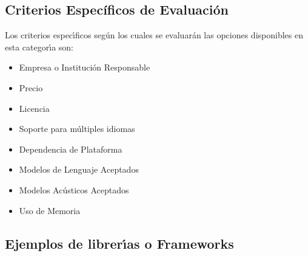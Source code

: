 \subsection{Criterios Espec\'ificos de Evaluaci\'on}

Los criterios espec{\'\i}ficos seg\'un los cuales se evaluar\'an las opciones disponibles en esta
categor{\'\i}a son:

\begin{itemize}
	\item Empresa o Instituci\'on Responsable
	\item Precio
	\item Licencia
	\item Soporte para m\'ultiples idiomas
	\item Dependencia de Plataforma
	\item Modelos de Lenguaje Aceptados
	\item Modelos Ac\'usticos Aceptados
	\item Uso de Memoria
\end{itemize}


\subsection{Ejemplos de librer{\'\i}as o Frameworks}






